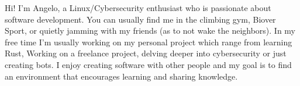 

\begin{cvparagraph}
	Hi! I'm Angelo, a Linux/Cybersecurity enthusiast who is passionate about software development. You can usually find me in the climbing gym, Biover Sport, or quietly jamming with my friends (as to not wake the neighbors). In my free time I'm usually working on my personal project which range from learning Rust, Working on a freelance project, delving deeper into cybersecurity or just creating bots. I enjoy creating software with other people and my goal is to find an environment that encourages learning and sharing knowledge.
\end{cvparagraph}


